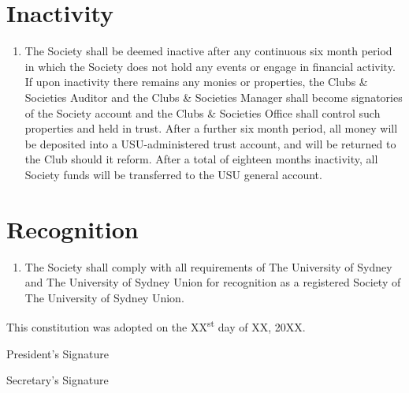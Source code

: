 \documentclass[11pt]{article}
\begin{document}
\section{Inactivity}
\begin{enumerate}[\thesection .1]
    \item The Society shall be deemed inactive after any continuous six month period in which the Society does not hold any events or engage in financial activity.  If upon inactivity there remains any monies or properties, the Clubs \& Societies Auditor and the Clubs \& Societies Manager shall become signatories of the Society account and the Clubs \& Societies Office shall control such properties and held in trust.  After a further six month period, all money will be deposited into a USU-administered trust account, and will be returned to the Club should it reform. After a total of eighteen months inactivity, all Society funds will be transferred to the USU general account.
\end{enumerate}


\section{Recognition}
\begin{enumerate}[\thesection .1]
    \item The Society shall comply with all requirements of The University of Sydney and The University of Sydney Union for recognition as a registered Society of The University of Sydney Union.
\end{enumerate}

\vspace{20mm}

This constitution was adopted on the XX\textsuperscript{st} day of XX, 20XX.

\vspace{20mm}
President's Signature \underline{\hspace{6cm}}

\vspace{20mm}
Secretary's Signature \underline{\hspace{6cm}}
\end{document}
